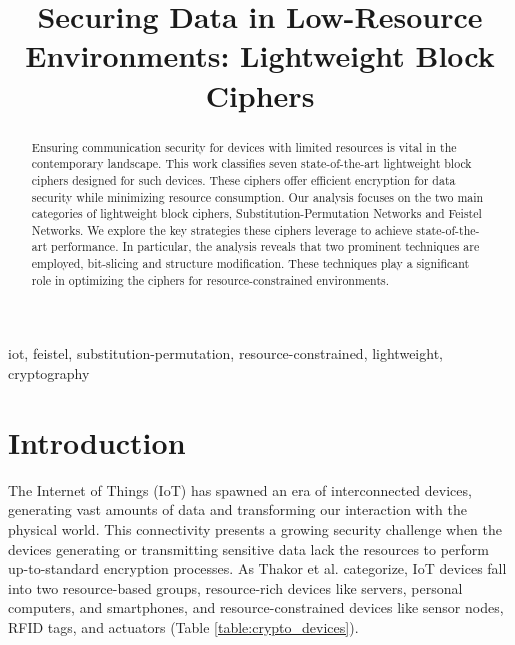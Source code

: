 \documentclass[conference]{IEEEtran}
\begin{document}
\title{Securing Data in Low-Resource Environments: Lightweight Block Ciphers}


\author{
\and
{}
}


\maketitle

\begin{abstract}
    Ensuring communication security for devices with limited resources is vital in the contemporary landscape. This work classifies seven state-of-the-art lightweight block ciphers designed for such devices. These ciphers offer efficient encryption for data security while minimizing resource consumption. Our analysis focuses on the two main categories of lightweight block ciphers, Substitution-Permutation Networks and Feistel Networks. We explore the key strategies these ciphers leverage to achieve state-of-the-art performance. In particular, the analysis reveals that two prominent techniques are employed, bit-slicing and structure modification. These techniques play a significant role in optimizing the ciphers for resource-constrained environments.
\end{abstract}

\begin{IEEEkeywords}
iot, feistel, substitution-permutation, resource-constrained, lightweight, cryptography
\end{IEEEkeywords}

\section{Introduction}

The Internet of Things (IoT) has spawned an era of interconnected devices, generating vast amounts of data and transforming our interaction with the physical world. This connectivity presents a growing security challenge when the devices generating or transmitting sensitive data lack the resources to perform up-to-standard encryption processes. As Thakor et al. \cite{IoT_1} categorize, IoT devices fall into two resource-based groups, resource-rich devices like servers, personal computers, and smartphones, and resource-constrained devices like sensor nodes, RFID tags, and actuators (Table \ref{table:crypto_devices}).
\end{document}
